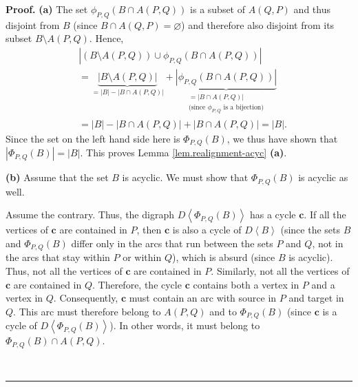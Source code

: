 \documentclass[numbers=enddot,12pt,final,onecolumn,notitlepage]{scrartcl}%
\theoremstyle{definition}
\newenvironment{proof}[1][Proof]{\noindent\textbf{#1.} }{\ \rule{0.5em}{0.5em}}
\theoremstyle{plainsl}
\begin{document}
\begin{proof}
\textbf{(a)} The set $\phi_{P,Q}\left(  B\cap A\left(  P,Q\right)  \right)  $
is a subset of $A\left(  Q,P\right)  $ and thus disjoint from $B$ (since
$B\cap A\left(  Q,P\right)  =\varnothing$) and therefore also disjoint from
its subset $B\setminus A\left(  P,Q\right)  $. Hence,%
\begin{align*}
&  \left\vert \left(  B\setminus A\left(  P,Q\right)  \right)  \cup\phi
_{P,Q}\left(  B\cap A\left(  P,Q\right)  \right)  \right\vert \\
&  =\underbrace{\left\vert B\setminus A\left(  P,Q\right)  \right\vert
}_{=\left\vert B\right\vert -\left\vert B\cap A\left(  P,Q\right)  \right\vert
}+\underbrace{\left\vert \phi_{P,Q}\left(  B\cap A\left(  P,Q\right)  \right)
\right\vert }_{\substack{=\left\vert B\cap A\left(  P,Q\right)  \right\vert
\\\text{(since }\phi_{P,Q}\text{ is a bijection)}}}\\
&  =\left\vert B\right\vert -\left\vert B\cap A\left(  P,Q\right)  \right\vert
+\left\vert B\cap A\left(  P,Q\right)  \right\vert =\left\vert B\right\vert .
\end{align*}
Since the set on the left hand side here is $\Phi_{P,Q}\left(  B\right)  $, we
thus have shown that $\left\vert \Phi_{P,Q}\left(  B\right)  \right\vert
=\left\vert B\right\vert $. This proves Lemma \ref{lem.realignment-acyc}
\textbf{(a)}. \medskip

\textbf{(b)} Assume that the set $B$ is acyclic. We must show that $\Phi
_{P,Q}\left(  B\right)  $ is acyclic as well.

Assume the contrary. Thus, the digraph $D\left\langle \Phi_{P,Q}\left(
B\right)  \right\rangle $ has a cycle $\mathbf{c}$. If all the vertices of
$\mathbf{c}$ are contained in $P$, then $\mathbf{c}$ is also a cycle of
$D\left\langle B\right\rangle $ (since the sets $B$ and $\Phi_{P,Q}\left(
B\right)  $ differ only in the arcs that run between the sets $P$ and $Q$, not
in the arcs that stay within $P$ or within $Q$), which is absurd (since $B$ is
acyclic). Thus, not all the vertices of $\mathbf{c}$ are contained in $P$.
Similarly, not all the vertices of $\mathbf{c}$ are contained in $Q$.
Therefore, the cycle $\mathbf{c}$ contains both a vertex in $P$ and a vertex
in $Q$. Consequently, $\mathbf{c}$ must contain an arc with source in $P$ and
target in $Q$. This arc must therefore belong to $A\left(  P,Q\right)  $ and
to $\Phi_{P,Q}\left(  B\right)  $ (since $\mathbf{c}$ is a cycle of
$D\left\langle \Phi_{P,Q}\left(  B\right)  \right\rangle $). In other words,
it must belong to $\Phi_{P,Q}\left(  B\right)  \cap A\left(  P,Q\right)  $.


\end{proof}
\end{document}
